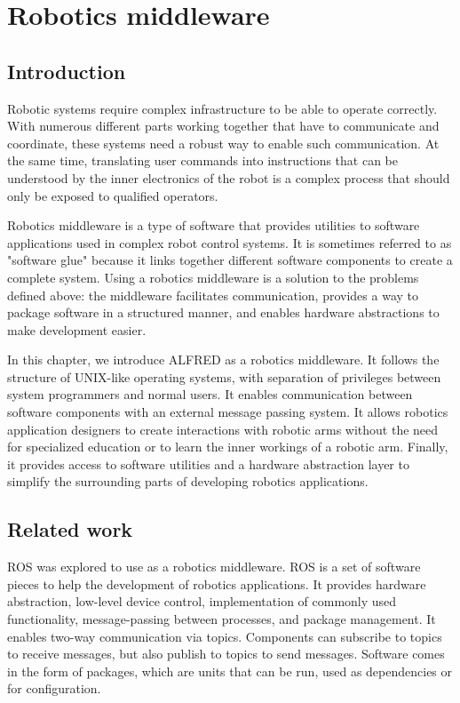 \chapter{Robotics middleware}



\section{Introduction}

Robotic systems require complex infrastructure to be able to operate correctly. With numerous different parts working together that have to communicate and coordinate, these systems need a robust way to enable such communication. At the same time, translating user commands into instructions that can be understood by the inner electronics of the robot is a complex process that should only be exposed to qualified operators.

Robotics middleware is a type of software that provides utilities to software applications used in complex robot control systems. It is sometimes referred to as "software glue" because it links together different software components to create a complete system. Using a robotics middleware is a solution to the problems defined above: the middleware facilitates communication, provides a way to package software in a structured manner, and enables hardware abstractions to make development easier.

In this chapter, we introduce ALFRED as a robotics middleware. It follows the structure of UNIX-like operating systems, with separation of privileges between system programmers and normal users. It enables communication between software components with an external message passing system. It allows robotics application designers to create interactions with robotic arms without the need for specialized education or to learn the inner workings of a robotic arm. Finally, it provides access to software utilities and a hardware abstraction layer to simplify the surrounding parts of developing robotics applications.



\section{Related work}

ROS \cite{ros} was explored to use as a robotics middleware. ROS is a set of software pieces to help the development of robotics applications. It provides hardware abstraction, low-level device control, implementation of commonly used functionality, message-passing between processes, and package management. It enables two-way communication via topics. Components can subscribe to topics to receive messages, but also publish to topics to send messages. Software comes in the form of packages, which are units that can be run, used as dependencies or for configuration.

